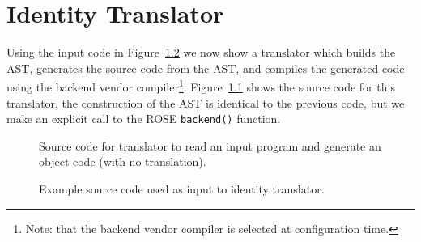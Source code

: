 \chapter{Identity Translator}

  Using the input code in Figure~\ref{Tutorial:exampleInputCode_IdentityTranslator}
we now show a translator which builds the AST, generates the source code from the AST, 
and compiles the generated code using the backend vendor compiler\footnote{
Note: that the backend vendor compiler is selected at configuration time.}.
Figure~\ref{Tutorial:exampleIdentityTranslator} shows the source code for this
translator, the construction of the AST is identical to the previous code, but
we make an explicit call to the ROSE {\tt backend()} function.

\begin{figure}[!h]
{\indent
{\mySmallFontSize


\begin{latexonly}
   
\end{latexonly}

\begin{htmlonly}
   
\end{htmlonly}

}
}
\caption{Source code for translator to read an input program 
         and generate an object code (with no translation).}
\label{Tutorial:exampleIdentityTranslator}
\end{figure}

\begin{figure}[!h]
{\indent
{\mySmallFontSize


\begin{latexonly}
   
\end{latexonly}

\begin{htmlonly}
   
\end{htmlonly}

}
}
\caption{Example source code used as input to identity translator.}
\label{Tutorial:exampleInputCode_IdentityTranslator}
\end{figure}

